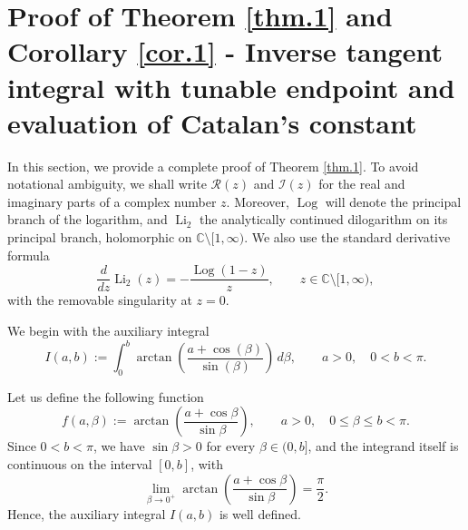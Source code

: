 \documentclass[preprint,12pt,nopreprintline]{elsarticle}
\begin{document}
\newpage
\section{Proof of Theorem \ref{thm.1} and Corollary \ref{cor.1} - Inverse tangent integral with tunable endpoint and evaluation of Catalan’s constant}

In this section, we provide a complete proof of Theorem \ref{thm.1}. To avoid notational ambiguity, we shall write \(\mathscr{R}(z)\) and \(\mathscr{I}(z)\) for the real and
imaginary parts of a complex number \(z\). Moreover, $\operatorname{Log}$ will denote the principal branch of the logarithm, and
$\operatorname{Li}_2$ the analytically continued dilogarithm on its principal branch,
holomorphic on \(\mathbb{C}\setminus [1,\infty)\). We also use the standard derivative formula
\begin{equation}
\frac{d}{dz}\operatorname{Li}_2(z) = -\frac{\operatorname{Log}(1-z)}{z},
\qquad z\in \mathbb{C}\setminus [1,\infty),
\end{equation}
with the removable singularity at \(z=0\).

We begin with the auxiliary integral
\begin{equation}
I(a,b):=\int_0^b \arctan\!\left(\frac{a+\cos\left(\beta\right)}{\sin\left(\beta\right)}\right)\,d\beta,
\qquad a>0,\quad 0<b<\pi.
\end{equation}

Let us define the following function
\[
f(a,\beta):=\arctan\!\left(\frac{a+\cos\beta}{\sin\beta}\right),
\qquad a>0,\quad 0\le \beta\le b<\pi.
\]
Since \(0<b<\pi\), we have \(\sin\beta>0\) for every \(\beta\in(0,b]\), and the integrand itself is
continuous on the interval \([0,b]\), with
\begin{equation}
\lim_{\beta\to 0^+}\arctan\!\left(\frac{a+\cos\beta}{\sin\beta}\right)=\frac{\pi}{2}.
\end{equation}
Hence, the auxiliary integral \(I(a,b)\) is well defined.
\end{document}
